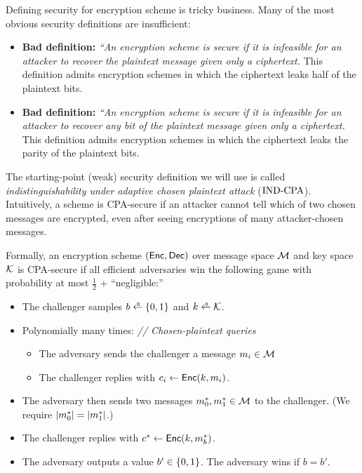 Defining security for encryption scheme is tricky business.
Many of the most obvious security definitions are insufficient:
\begin{itemize}
  \item \textbf{Bad definition:} \emph{``An encryption scheme is secure 
        if it is infeasible for an attacker to recover the plaintext
        message given only a ciphertext.}
        This definition admits encryption schemes in which the ciphertext
        leaks half of the plaintext bits.
  \item \textbf{Bad definition:} \emph{``An encryption scheme is secure 
        if it is infeasible for an attacker to recover any bit of
        the plaintext message given only a ciphertext.}
        This definition admits encryption schemes in which the ciphertext
        leaks the parity of the plaintext bits.
\end{itemize}

The starting-point (weak) security definition we will use
is called \emph{indistinguishability under adaptive chosen plaintext attack}
($\text{IND-CPA}$).
Intuitively, a scheme is CPA-secure if an attacker cannot tell which of two chosen messages are encrypted, even after seeing encryptions of many attacker-chosen messages.

\begin{definition}\label{defn:cpa}
Formally, an encryption scheme $(\mathsf{Enc}, \mathsf{Dec})$ over message space $\mathcal{M}$
and key space $\mathcal{K}$ is CPA-secure if 
all efficient adversaries win
the following game with probability at most $\tfrac{1}{2}$ + ``negligible:''
  \begin{itemize}[noitemsep]
		\item The challenger samples $b \rgets \bin$ and $k \rgets \calK$.
    \item Polynomially many times: \quad \emph{// Chosen-plaintext queries}
          \begin{itemize}
            \item The adversary sends the challenger a message $m_i \in \mathcal{M}$
            \item The challenger replies with $c_i \gets \mathsf{Enc}(k, m_i)$.
          \end{itemize}
    \item The adversary then sends two messages $m^*_0, m^*_1 \in \mathcal{M}$ to the challenger.
          (We require $\left| m^*_0 \right| = \left| m^*_1 \right|$.)

    \item The challenger replies with $c^* \gets \mathsf{Enc}(k, m^*_b)$.
		\item The adversary outputs a value $b' \in \{0,1\}$. The adversary wins if $b=b'$. 
	\end{itemize}
\end{definition}

